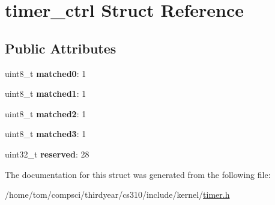 \hypertarget{structtimer__ctrl}{}\section{timer\+\_\+ctrl Struct Reference}
\label{structtimer__ctrl}
\subsection*{Public Attributes}
\begin{DoxyCompactItemize}
\item 
\mbox{\label{structtimer__ctrl_ab2ef74d956c95f013fc1c7a1ac2277dc}} 
uint8\+\_\+t {\bfseries matched0}\+: 1
\item 
\mbox{\label{structtimer__ctrl_ad4c21d5741216294f0356c57f56bc500}} 
uint8\+\_\+t {\bfseries matched1}\+: 1
\item 
\mbox{\label{structtimer__ctrl_ac150da5d093bcbba851a54a2300bd0d9}} 
uint8\+\_\+t {\bfseries matched2}\+: 1
\item 
\mbox{\label{structtimer__ctrl_ad9306cd02644c1bd018134a1117a5582}} 
uint8\+\_\+t {\bfseries matched3}\+: 1
\item 
\mbox{\label{structtimer__ctrl_ae17bcd5ecd2b1df0381a9e6399ee55fc}} 
uint32\+\_\+t {\bfseries reserved}\+: 28
\end{DoxyCompactItemize}


The documentation for this struct was generated from the following file\+:\begin{DoxyCompactItemize}
\item 
/home/tom/compsci/thirdyear/cs310/include/kernel/\mbox{\hyperlink{timer_8h}{timer.\+h}}\end{DoxyCompactItemize}
